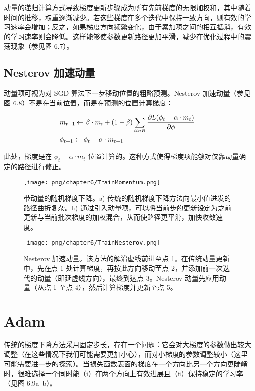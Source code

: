 动量的递归计算方式导致梯度更新步骤成为所有先前梯度的无限加权和，其中随着时间的推移，权重逐渐减少。若这些梯度在多个迭代中保持一致方向，则有效的学习速率会增加；反之，如果梯度方向频繁变化，由于累加项之间的相互抵消，有效的学习速率则会降低。这样能够使参数更新路径更加平滑，减少在优化过程中的震荡现象（参见图 6.7）。

\subsection{Nesterov 加速动量}
动量项可视为对 SGD 算法下一步移动位置的粗略预测。Nesterov 加速动量（参见图 6.8）不是在当前位置，而是在预测的位置计算梯度：


\begin{align}
& m_{t+1} \leftarrow \beta \cdot m_t + (1 - \beta) \sum_{i in B} \frac{\partial L(\phi_t - \alpha \cdot m_t)}{\partial \phi} \notag \\
& \phi_{t+1} \leftarrow \phi_t - \alpha \cdot m_{t+1} 
\end{align} 


此处，梯度是在 \(\phi_t - \alpha \cdot m_t\) 位置计算的。这种方式使得梯度项能够对仅靠动量确定的路径进行修正。

\begin{figure}[ht!]
\centering
\texttt{[image: png/chapter6/TrainMomentum.png]}
\caption{带动量的随机梯度下降。a) 传统的随机梯度下降方法向最小值进发的路径曲折复杂。b) 通过引入动量项，可以将当前步的更新设定为之前更新与当前批次梯度的加权混合，从而使路径更平滑，加快收敛速度。}
\end{figure}

\begin{figure}[ht!]
\centering
\texttt{[image: png/chapter6/TrainNesterov.png]}
\caption{Nesterov 加速动量。该方法的解沿虚线前进至点 1。在传统动量更新中，先在点 1 处计算梯度，再按此方向移动至点 2，并添加前一次迭代的动量（即延虚线方向），最终到达点 3。Nesterov 动量先应用动量（从点 1 至点 4），然后计算梯度并更新至点 5。}
\end{figure}

\section{Adam}
传统的梯度下降方法采用固定步长，存在一个问题：它会对大梯度的参数做出较大调整（在这些情况下我们可能需要更加小心），而对小梯度的参数调整较小（这里可能需要进一步的探索）。当损失函数表面的梯度在一个方向比另一个方向更陡峭时，很难选择一个同时能（i）在两个方向上有效进展且（ii）保持稳定的学习率（见图 6.9a–b）。

